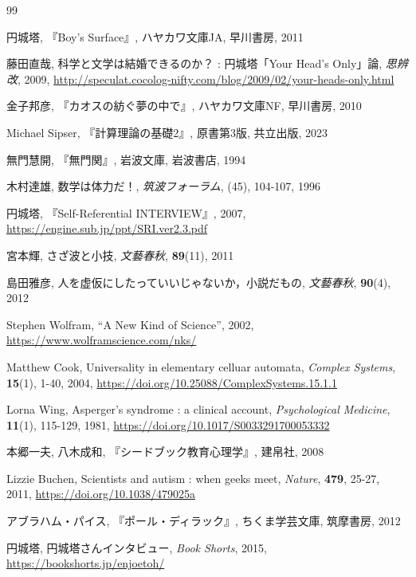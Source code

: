 \documentclass[10pt, a5paper, twoside]{ltjsarticle}
\begin{document}
	\begin{thebibliography}{99}

		 円城塔, 『Boy's Surface』, ハヤカワ文庫JA, 早川書房, 2011

         藤田直哉, 科学と文学は結婚できるのか？ : 円城塔「Your Head's Only」論, \textit{思辨改}, 2009, \url{http://speculat.cocolog-nifty.com/blog/2009/02/your-heads-only.html}

         金子邦彦, 『カオスの紡ぐ夢の中で』, ハヤカワ文庫NF, 早川書房, 2010

         Michael Sipser, 『計算理論の基礎2』, 原書第3版, 共立出版, 2023

         無門慧開, 『無門関』, 岩波文庫, 岩波書店, 1994

         木村達雄, 数学は体力だ！, \textit{筑波フォーラム}, (45), 104-107, 1996

         円城塔, 『Self-Referential INTERVIEW』, 2007, \url{https://engine.sub.jp/ppt/SRI.ver2.3.pdf}

         宮本輝, さざ波と小技, \textit{文藝春秋}, \textbf{89}(11), 2011

         島田雅彦, 人を虚仮にしたっていいじゃないか，小説だもの, \textit{文藝春秋}, \textbf{90}(4), 2012

         Stephen Wolfram, ``A New Kind of Science'', 2002, \url{https://www.wolframscience.com/nks/}

         Matthew Cook, Universality in elementary celluar automata, \textit{Complex Systems}, \textbf{15}(1), 1-40, 2004, \url{https://doi.org/10.25088/ComplexSystems.15.1.1}

         Lorna Wing, Asperger's syndrome : a clinical account, \textit{Psychological Medicine}, \textbf{11}(1), 115-129, 1981, \url{https://doi.org/10.1017/S0033291700053332}

         本郷一夫, 八木成和, 『シードブック教育心理学』, 建帛社, 2008

         Lizzie Buchen, Scientists and autism : when geeks meet, \textit{Nature}, \textbf{479}, 25-27, 2011, \url{https://doi.org/10.1038/479025a}

         アブラハム・パイス, 『ポール・ディラック』, ちくま学芸文庫, 筑摩書房, 2012

         円城塔, 円城塔さんインタビュー, \textit{Book Shorts}, 2015, \url{https://bookshorts.jp/enjoetoh/}


\end{thebibliography}
\end{document}
